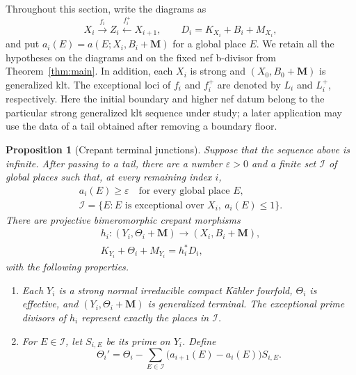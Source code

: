 \documentclass[11pt]{amsart}
\newtheorem{proposition}[theorem]{Proposition}
\theoremstyle{definition}
\theoremstyle{remark}
\numberwithin{equation}{section}
\newcommand{\M}{\mathbf{M}}
\begin{document}
Throughout this section, write the diagrams as
\[
 X_i\xrightarrow{f_i}Z_i\xleftarrow{f_i^+}X_{i+1},
 \qquad D_i=K_{X_i}+B_i+M_{X_i},
\]
and put $a_i(E)=a(E;X_i,B_i+\M)$ for a global place $E$.  We retain all
the hypotheses on the diagrams and on the fixed nef b-divisor from
Theorem~\ref{thm:main}.  In addition, each $X_i$ is strong and
$(X_0,B_0+\M)$ is generalized klt.  The exceptional
loci of $f_i$ and $f_i^+$ are denoted by $L_i$ and $L_i^+$, respectively.
Here the initial boundary and higher nef datum belong to the particular
strong generalized klt sequence under study; a later application may use
the data of a tail obtained after removing a boundary floor.

\begin{proposition}[Crepant terminal junctions]\label{prop:terminal-junctions}
Suppose that the sequence above is infinite.  After passing to a tail,
there are a number $\varepsilon>0$ and a finite set $\mathcal I$ of global
places such that, at every remaining index $i$,
\begin{equation}\label{eq:stable-low-places}
 \begin{gathered}
 a_i(E)\geq\varepsilon\quad\text{for every global place }E,
 \\
 \mathcal I=
 \{E:E\text{ is exceptional over }X_i,\ a_i(E)\leq 1\}.
 \end{gathered}
\end{equation}
There are projective bimeromorphic crepant morphisms
\begin{equation}\label{eq:terminal-junction}
 \begin{gathered}
 h_i:(Y_i,\Theta_i+\M)\longrightarrow (X_i,B_i+\M),
 \\
 K_{Y_i}+\Theta_i+M_{Y_i}=h_i^*D_i,
 \end{gathered}
\end{equation}
with the following properties.
\begin{enumerate}
\item Each $Y_i$ is a strong normal irreducible compact K\"ahler fourfold,
$\Theta_i$ is effective, and
$(Y_i,\Theta_i+\M)$ is generalized terminal.  The exceptional prime
divisors of $h_i$ represent exactly the places in $\mathcal I$.
\item For $E\in\mathcal I$, let $S_{i,E}$ be its prime on $Y_i$.  Define
\begin{equation}\label{eq:junction-coefficient-change}
 \Theta_i'=
 \Theta_i-\sum_{E\in\mathcal I}
       \bigl(a_{i+1}(E)-a_i(E)\bigr)S_{i,E}.
\end{equation}

\end{enumerate}
\end{proposition}
\end{document}
